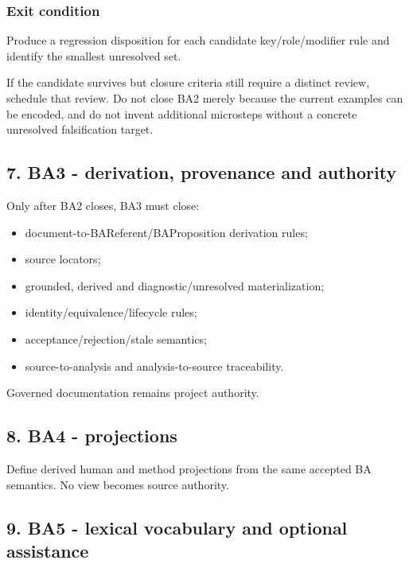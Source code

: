 \documentclass[
  10pt,
  letterpaper,
]{article}
\providecommand{\tightlist}{%
  \setlength{\itemsep}{0pt}\setlength{\parskip}{0pt}}
\begin{document}
\subsubsection{Exit condition}\label{exit-condition}

Produce a regression disposition for each candidate key/role/modifier
rule and identify the smallest unresolved set.

If the candidate survives but closure criteria still require a distinct
review, schedule that review. Do not close BA2 merely because the
current examples can be encoded, and do not invent additional microsteps
without a concrete unresolved falsification target.

\subsection{7. BA3 - derivation, provenance and
authority}\label{ba3---derivation-provenance-and-authority}

Only after BA2 closes, BA3 must close:

\begin{itemize}
\tightlist
\item
  document-to-BAReferent/BAProposition derivation rules;
\item
  source locators;
\item
  grounded, derived and diagnostic/unresolved materialization;
\item
  identity/equivalence/lifecycle rules;
\item
  acceptance/rejection/stale semantics;
\item
  source-to-analysis and analysis-to-source traceability.
\end{itemize}

Governed documentation remains project authority.

\subsection{8. BA4 - projections}\label{ba4---projections}

Define derived human and method projections from the same accepted BA
semantics. No view becomes source authority.

\subsection{9. BA5 - lexical vocabulary and optional
assistance}\label{ba5---lexical-vocabulary-and-optional-assistance}
\end{document}
